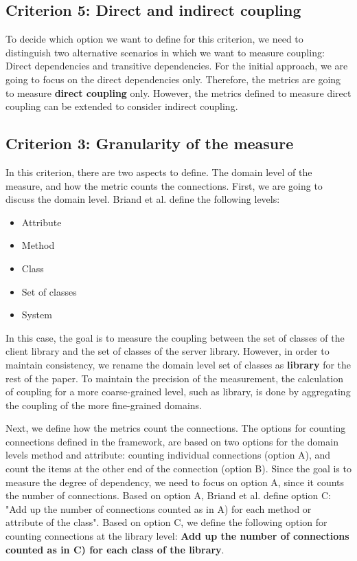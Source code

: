 \documentclass[a4paper]{article}
\begin{document}
\subsection{Criterion 5: Direct and indirect coupling}
To decide which option we want to define for this criterion, we need to distinguish two alternative scenarios in which we want to measure coupling: Direct dependencies and transitive dependencies. For the initial approach, we are going to focus on the direct dependencies only. Therefore, the metrics are going to measure \textbf{direct coupling} only. However, the metrics defined to measure direct coupling can be extended to consider indirect coupling.

\subsection{Criterion 3: Granularity of the measure}
In this criterion, there are two aspects to define. The domain level of the measure, and how the metric counts the connections. First, we are going to discuss the domain level. Briand et al. define the following levels:

\begin{itemize}[noitemsep]
  \item Attribute
  \item Method
  \item Class
  \item Set of classes
  \item System
\end{itemize}

In this case, the goal is to measure the coupling between the set of classes of the client library and the set of classes of the server library. However, in order to maintain consistency, we rename the domain level set of classes as \textbf{library} for the rest of the paper. To maintain the precision of the measurement, the calculation of coupling for a more coarse-grained level, such as library, is done by aggregating the coupling of the more fine-grained domains.

Next, we define how the metrics count the connections. The options for counting connections defined in the framework, are based on two options for the domain levels method and attribute: counting individual connections (option A), and count the items at the other end of the connection (option B). Since the goal is to measure the degree of dependency, we need to focus on option A, since it counts the number of connections. Based on option A, Briand et al. define option C: "Add up the number of connections counted as in A) for each method or attribute of the class". Based on option C, we define the following option for counting connections at the library level: \textbf{Add up the number of connections counted as in C) for each class of the library}.
\end{document}
